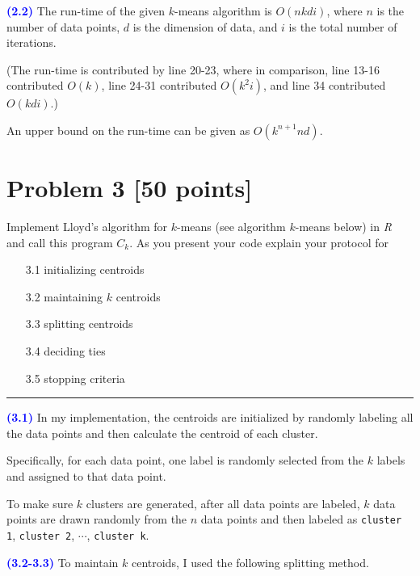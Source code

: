 \documentclass[a4paper,11pt]{article}
\newcommand{\code}[1]{\texttt{#1}}
\newcommand{\qnum}[1]{\noindent\textcolor{blue}{\textbf{(#1)}}}
\newcommand{\sep}{\begin{center}\textcolor{gray}{\rule{\textwidth}{0.75pt}}\end{center}}
\begin{document}
\qnum{2.2}
The run-time of the given $k$-means algorithm is $O(nkdi)$, where $n$ is the number of data points, $d$ is the dimension of data, and $i$ is the total number of iterations.

(The run-time is contributed by line 20-23, where in comparison, line 13-16 contributed $O(k)$, line 24-31 contributed $O(k^2i)$, and line 34 contributed $O(kdi)$.)

An upper bound on the run-time can be given as $O(k^{n+1}nd)$.
\bigskip




















\newpage 
\section*{Problem 3 [50 points]} 

 Implement Lloyd's algorithm for $k$-means (see algorithm $k$-means below)  in \textit{R} and call this program $C_k$. As you present your code explain your protocol for


\begin{enumerate}
  \item[3.1] initializing centroids
  \item[3.2] maintaining $k$ centroids
  \item[3.3] splitting centroids
  \item[3.4]  deciding ties
  \item[3.5] stopping criteria
\end{enumerate}
\sep 


\qnum{3.1}
In my implementation, the centroids are initialized by randomly labeling all the data points and then calculate the centroid of each cluster.

Specifically, for each data point, one label is randomly selected from the $k$ labels and assigned to that data point.

To make sure $k$ clusters are generated, after all data points are labeled, $k$ data points are drawn randomly from the $n$ data points and then labeled as \code{cluster 1}, \code{cluster 2}, $\cdots$, \code{cluster k}.
\bigskip 


\qnum{3.2-3.3}
To maintain $k$ centroids, I used the following splitting method.
\end{document}
